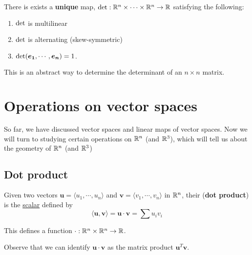 \begin{definition}
There is exists a \textbf{unique} map, $\textnormal{det} : \mathbb{R}^n \times \cdots \times \mathbb{R}^n \to \mathbb{R}$ satisfying the following:
\begin{enumerate}
    \item $\textnormal{det}$ is multilinear
    \item $\textnormal{det}$ is alternating (skew-symmetric)
    \item $\textnormal{det}(\bm{e_1}, \cdots, \bm{e_n}) = 1$.
\end{enumerate}

This is an abstract way to determine the determinant of an $n\times n$ matrix.
\end{definition}


\section{Operations on vector spaces}\label{operations}

So far, we have discussed vector spaces and linear maps of vector spaces. Now we will turn to studying certain operations on $\mathbb{R}^n$ (and $\mathbb{R}^3$), which will tell us about the geometry of $\mathbb{R}^n$ (and $\mathbb{R}^3$)

\subsection{Dot product}

\begin{definition}
    Given two vectors $\bm{u} = \langle u_1, \cdots, u_n \rangle$ and $\bm{v}  = \langle v_1 , \cdots, v_n \rangle$ in $\mathbb{R}^n$, their (\textbf{dot product}) is the \underline{scalar} defined by $$\langle \bm{u}, \bm{v}\rangle = \bm{u} \cdot \bm{v} = \sum u_iv_i$$
    
    This defines a function $\cdot: \mathbb{R}^n \times \mathbb{R}^n \to \mathbb{R}$.
    
    \end{definition}


\begin{remark}
Observe that we can identify $\bm{u} \cdot \bm{v}$ as the matrix product $\bm{u}^{T} \bm{v}$.
\end{remark}



